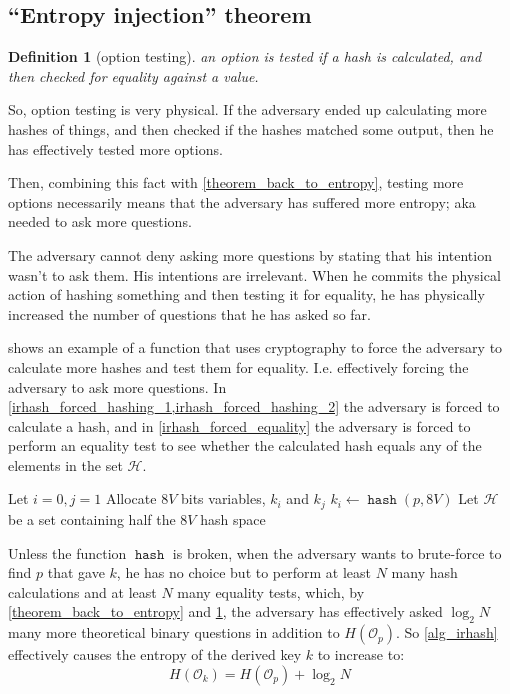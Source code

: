 \documentclass[twocolumn]{article}
\newtheorem{definition}{Definition}[section]
\DeclareMathOperator{\hash}{\mathtt{hash}}
\DeclareMathOperator{\irhash}{\mathtt{irhash}}
\begin{document}
\subsection{``Entropy injection'' theorem}
\begin{definition}[option testing]\label{def_option_testing}
    an option is tested if a hash is calculated, and then checked for
    equality against a value.
\end{definition}

So, option testing is very physical.  If the adversary ended up calculating
more hashes of things, and then checked if the hashes matched some output,
then he has effectively tested more options.

Then, combining this fact with \cref{theorem_back_to_entropy}, testing more
options necessarily means that the adversary has suffered more entropy; aka
needed to ask more questions.

The adversary cannot deny asking more questions by stating that his
intention wasn't to ask them.  His intentions are irrelevant.  When he
commits the physical action of hashing something and then testing it for
equality, he has physically increased the number of questions that he has
asked so far.

 shows an example of a function that uses cryptography to
force the adversary to calculate more hashes and test them for equality.
I.e. effectively forcing the adversary to ask more questions.  In
\cref{irhash_forced_hashing_1,irhash_forced_hashing_2} the adversary is
forced to calculate a hash, and in \cref{irhash_forced_equality} the
adversary is forced to perform an equality test to see whether the
calculated hash equals any of the elements in the set $\mathcal{H}$.

\begin{algorithm}
Let $i=0, j=1$\;
Allocate $8V$ bits variables, $k_i$ and $k_j$\;
$k_i \gets \hash(p, 8V)$\;\label{irhash_forced_hashing_1}
Let $\mathcal{H}$ be a set containing half the $8V$ hash space\;
\For{$0, 1, \ldots, N-1$}{
    \If{$k_i \in \mathcal{H}$}{\label{irhash_forced_equality}
        $k_i \gets k_i + 1$\;
    }
    $k_j \gets \hash(k_i, 8V)$\;\label{irhash_forced_hashing_2}
    $\hat i \gets i$\;
    $i \gets j$\;
    $j \gets \hat i$\;
}
\caption{$\irhash(p, 8V, N)$}
\label{alg_irhash}
\end{algorithm}

Unless the function $\hash$ is broken, when the adversary wants to
brute-force to find $p$ that gave $k$, he has no choice but to perform at
least $N$ many hash calculations and at least $N$ many equality tests,
which, by \cref{theorem_back_to_entropy} and \cref{def_option_testing}, the
adversary has effectively asked $\log_2 N$ many more theoretical binary
questions in addition to $H(\mathcal{O}_p)$.  So \cref{alg_irhash}
effectively causes the entropy of the derived key $k$ to increase to:
\begin{equation}
    H(\mathcal{O}_k) = H(\mathcal{O}_p) + \log_2 N
\end{equation}
\end{document}
